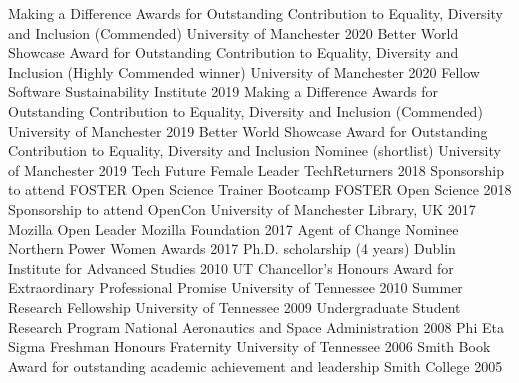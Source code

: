 \begin{cvpress}
 \cvpres
    {Making a Difference Awards for Outstanding Contribution to Equality, Diversity and Inclusion (Commended)}
    {University of Manchester}
    {2020}
 \cvpres
    {Better World Showcase Award for Outstanding Contribution to Equality, Diversity and Inclusion (Highly Commended winner)}
    {University of Manchester}
    {2020}
 \cvpres
    {Fellow}
    {Software Sustainability Institute}
    {2019}
 \cvpres
    {Making a Difference Awards for Outstanding Contribution to Equality, Diversity and Inclusion (Commended)}
    {University of Manchester}
    {2019}
 \cvpres
    {Better World Showcase Award for Outstanding Contribution to Equality, Diversity and Inclusion Nominee (shortlist)}
    {University of Manchester}
    {2019}
 \cvpres
    {Tech Future Female Leader}
    {TechReturners}
    {2018}
 \cvpres
    {Sponsorship to attend FOSTER Open Science Trainer Bootcamp}
    {FOSTER Open Science}
    {2018}
 \cvpres
    {Sponsorship to attend OpenCon}
    {University of Manchester Library, UK}
    {2017}
 \cvpres
    {Mozilla Open Leader}
    {Mozilla Foundation}
    {2017}
  \cvpres
    {Agent of Change Nominee}
    {Northern Power Women Awards}
    {2017}  
    \cvpres
    {Ph.D. scholarship (4 years)}
    {Dublin Institute for Advanced Studies}
    {2010}
  \cvpres
    {UT Chancellor's Honours Award for Extraordinary Professional Promise}
    {University of Tennessee}
    {2010}
  \cvpres
    {Summer Research Fellowship}
    {University of Tennessee}
    {2009}
  \cvpres
    {Undergraduate Student Research Program}
    {National Aeronautics and Space Administration}
    {2008}
  \cvpres
    {Phi Eta Sigma Freshman Honours Fraternity}
    {University of Tennessee}
    {2006}
  \cvpres
    {Smith Book Award for outstanding academic achievement and leadership}
    {Smith College}
    {2005}
\end{cvpress}


